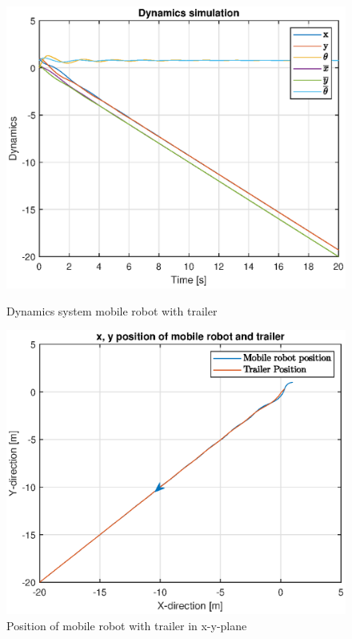 \begin{figure}[H]
\begin{minipage}{0.5\textwidth}
    \centering
    \includegraphics[width=\textwidth]{Problems/ex12_dynamics.eps}
    \caption{Dynamics system mobile robot with trailer}
    \label{fig:ex12_dyn}
\end{minipage}
\begin{minipage}{0.5\textwidth}
    \centering
    \includegraphics[width=\textwidth]{Problems/ex12_xyposition.eps}
    \caption{Position of mobile robot with trailer in x-y-plane}
    \label{fig:ex12_xyposition}
\end{minipage}
\end{figure}
